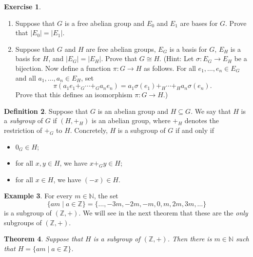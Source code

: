 \documentclass[a4paper]{memoir}
\newtheorem{theorem}{Theorem}[section]
\theoremstyle{definition}
\newtheorem{definition}[theorem]{Definition}
\newtheorem{exercise}[theorem]{Exercise}
\newtheorem{example}[theorem]{Example}
\newcommand{\bb}{\mathbb}
\newcommand{\ra}{\rightarrow}
\begin{document}
\begin{exercise}
  \begin{enumerate}
    \item Suppose that $G$ is a free abelian group and $E_0$ and $E_1$ are bases for 
    $G$. Prove that $|E_0| = |E_1|$.
    \item Suppose that $G$ and $H$ are free abelian groups, $E_G$ is a basis for $G$, 
    $E_H$ is a basis for $H$, and $|E_G| = |E_H|$. Prove that $G \cong H$. (Hint: 
    Let $\sigma : E_G \ra E_H$ be a bijection. Now define a function $\pi : G \ra H$ 
    as follows. For all $e_1, \ldots, e_n \in E_G$ and all $a_1, \ldots, a_n \in E_H$, 
    set
    \[
      \pi(a_1e_1 +_G \cdots +_G a_ne_n) = a_1 \sigma(e_1) +_H \cdots +_H a_n \sigma(e_n).
    \]
    Prove that this defines an isomorphism $\pi : G \ra H$.)
  \end{enumerate}
\end{exercise}

\begin{definition}
  Suppose that $G$ is an abelian group and $H \subseteq G$. We say that $H$ is a 
  \emph{subgroup} of $G$ if $(H, +_H)$ is an abelian group, where $+_H$ denotes the 
  restriction of $+_G$ to $H$. Concretely, $H$ is a subgroup of $G$ if and only if
  \begin{itemize}
    \item $0_G \in H$;
    \item for all $x,y \in H$, we have $x +_G y \in H$;
    \item for all $x \in H$, we have $(-x) \in H$.
  \end{itemize}
\end{definition}

\begin{example}
  For every $m \in \bb{N}$, the set
  \[
    \{am \mid a \in \bb{Z}\} = \{\ldots, -3m, -2m, -m, 0, m, 2m, 3m, \ldots\}
  \]
  is a subgroup of $(\bb{Z}, +)$. We will see in the next theorem that these are the 
  \emph{only} subgroups of $(\bb{Z}, +)$.
\end{example}

\begin{theorem} \label{thm: cyclic_subgroup}
  Suppose that $H$ is a subgroup of $(\bb{Z}, +)$. Then there is $m \in \bb{N}$ such that 
  $H = \{am \mid a \in \bb{Z}\}$.
\end{theorem}
\end{document}

